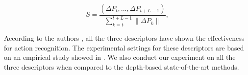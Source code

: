 \documentclass[final,3p,times,twocolumn]{elsarticle}
\begin{document}
\begin{equation}
	\textit{$\bar{S} = \frac{(\Delta P_t, ..., \Delta P_{t+L-1})}{\sum_{k=t}^{t+L-1}\|\Delta P_k\|}$},
\end{equation}
\fi

According to the authors \cite{laptev2008learning, wang2011densetraj, wang2009evaluation, liu2009recognizing}, all the three descriptors have shown the effectiveness for action recognition. The experimental settings for these descriptors are based on an empirical study showed in \cite{wang2011densetraj}. We also conduct our experiment on all the three descriptors when compared to the depth-based state-of-the-art methods.
\end{document}
